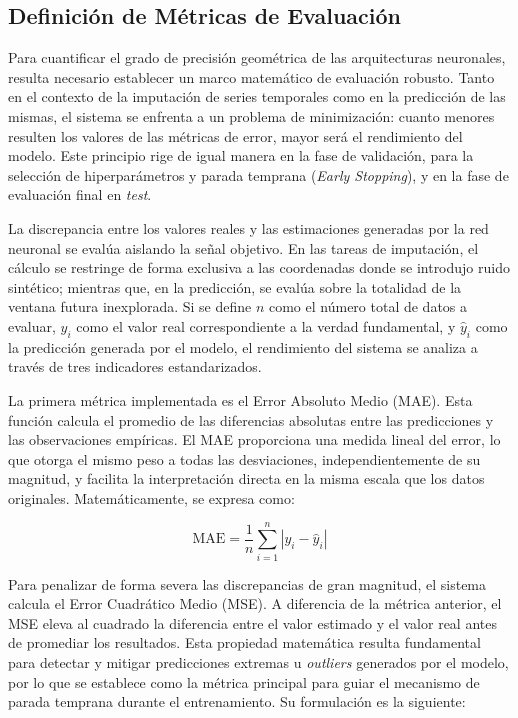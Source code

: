 \subsection{Definición de Métricas de Evaluación}
\label{sec:metrics}

Para cuantificar el grado de precisión geométrica de las arquitecturas neuronales, resulta necesario establecer un marco matemático de evaluación robusto. Tanto en el contexto de la imputación de series temporales como en la predicción de las mismas, el sistema se enfrenta a un problema de minimización: cuanto menores resulten los valores de las métricas de error, mayor será el rendimiento del modelo. Este principio rige de igual manera en la fase de validación, para la selección de hiperparámetros y parada temprana (\textit{Early Stopping}), y en la fase de evaluación final en \textit{test}.

La discrepancia entre los valores reales y las estimaciones generadas por la red neuronal se evalúa aislando la señal objetivo. En las tareas de imputación, el cálculo se restringe de forma exclusiva a las coordenadas donde se introdujo ruido sintético; mientras que, en la predicción, se evalúa sobre la totalidad de la ventana futura inexplorada. Si se define $n$ como el número total de datos a evaluar, $y_i$ como el valor real correspondiente a la verdad fundamental, y $\hat{y}_i$ como la predicción generada por el modelo, el rendimiento del sistema se analiza a través de tres indicadores estandarizados.

La primera métrica implementada es el Error Absoluto Medio (MAE). Esta función calcula el promedio de las diferencias absolutas entre las predicciones y las observaciones empíricas. El MAE proporciona una medida lineal del error, lo que otorga el mismo peso a todas las desviaciones, independientemente de su magnitud, y facilita la interpretación directa en la misma escala que los datos originales. Matemáticamente, se expresa como:

\begin{equation}
	\text{MAE} = \frac{1}{n} \sum_{i=1}^{n} | y_i - \hat{y}_i |
\end{equation}

Para penalizar de forma severa las discrepancias de gran magnitud, el sistema calcula el Error Cuadrático Medio (MSE). A diferencia de la métrica anterior, el MSE eleva al cuadrado la diferencia entre el valor estimado y el valor real antes de promediar los resultados. Esta propiedad matemática resulta fundamental para detectar y mitigar predicciones extremas u \textit{outliers} generados por el modelo, por lo que se establece como la métrica principal para guiar el mecanismo de parada temprana durante el entrenamiento. Su formulación es la siguiente:

